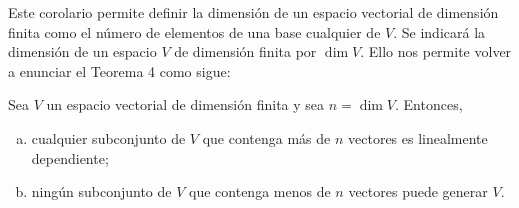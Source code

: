 Este corolario permite definir la dimensión de un espacio vectorial de dimensión finita como el número de elementos de una base cualquier de $V$. Se indicará la dimensión de un espacio $V$ de dimensión finita por $\dim V$. Ello nos permite volver a enunciar el Teorema 4 como sigue:

\begin{cor}
    Sea $V$ un espacio vectorial de dimensión finita y sea $n=\dim V$. Entonces,
    \begin{enumerate}[(a)]
	\item cualquier subconjunto de $V$ que contenga más de $n$ vectores es linealmente dependiente;
	\item ningún subconjunto de $V$ que contenga menos de $n$ vectores puede generar $V$.
    \end{enumerate}
\end{cor}

